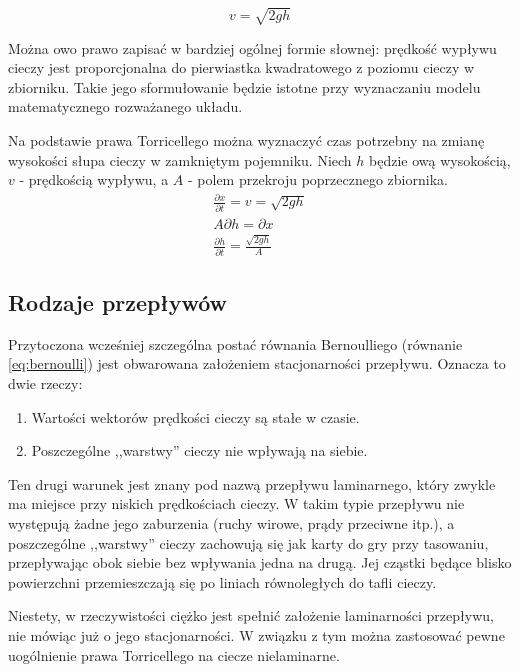 \begin{equation}\label{eq:torricelli}
	v = \sqrt{2gh}
\end{equation}

Można owo prawo zapisać w bardziej ogólnej formie słownej: prędkość wypływu cieczy jest proporcjonalna do pierwiastka kwadratowego z poziomu cieczy w zbiorniku. Takie jego sformułowanie będzie istotne przy wyznaczaniu modelu matematycznego rozważanego układu.

Na podstawie prawa Torricellego można wyznaczyć czas potrzebny na zmianę wysokości słupa cieczy w zamkniętym pojemniku. Niech $h$ będzie ową wysokością, $v$ - prędkością wypływu, a $A$ - polem przekroju poprzecznego zbiornika.
\begin{equation}
    \begin{array}{lr}
        \frac{\partial x}{\partial t} = v = \sqrt{2gh} \\
        A \partial h = \partial x \\
        \frac{\partial h}{\partial t} = \frac{\sqrt{2gh}}{A}
    \end{array}
\end{equation}



\subsection{Rodzaje przepływów}
\label{sub:plyny-przeplywy}

Przytoczona wcześniej szczególna postać równania Bernoulliego (równanie \ref{eq:bernoulli}) jest obwarowana założeniem stacjonarności przepływu. Oznacza to dwie rzeczy:
\begin{enumerate}
    \item Wartości wektorów prędkości cieczy są stałe w czasie.
    \item Poszczególne ,,warstwy'' cieczy nie wpływają na siebie.
\end{enumerate}

Ten drugi warunek jest znany pod nazwą przepływu laminarnego, który zwykle ma miejsce przy niskich prędkościach cieczy. W takim typie przepływu nie występują żadne jego zaburzenia (ruchy wirowe, prądy przeciwne itp.), a poszczególne ,,warstwy'' cieczy zachowują się jak karty do gry przy tasowaniu, przepływając obok siebie bez wpływania jedna na drugą. Jej cząstki będące blisko powierzchni przemieszczają się po liniach równoległych do tafli cieczy.

Niestety, w rzeczywistości ciężko jest spełnić założenie laminarności przepływu, nie mówiąc już o jego stacjonarności. W związku z tym można zastosować pewne uogólnienie prawa Torricellego na ciecze nielaminarne. 